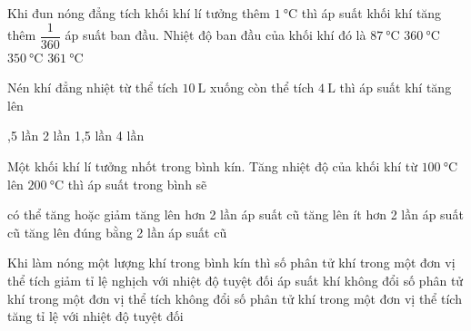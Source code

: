 \begin{ex}
	Khi đun nóng đẳng tích khối khí lí tưởng thêm $\SI{1}{\celsius}$ thì áp suất khối khí tăng thêm $\dfrac{1}{360}$ áp suất ban đầu. Nhiệt độ ban đầu của khối khí đó là 
	\choice
	{\True $\SI{87}{\celsius}$}
	{$\SI{360}{\celsius}$}
	{$\SI{350}{\celsius}$}
	{$\SI{361}{\celsius}$}
\end{ex}
\begin{ex}
Nén khí đẳng nhiệt từ thể tích $\SI{10}{\liter}$ xuống còn thể tích $\SI{4}{\liter}$ thì áp suất khí tăng lên
	
	\choice
	{,5 lần}
	{2 lần}
	{1,5 lần}
	{4 lần}
\end{ex}
\begin{ex}
Một khối khí lí tưởng nhốt trong bình kín. Tăng nhiệt độ của khối khí từ $\SI{100}{\celsius}$ lên $\SI{200}{\celsius}$ thì áp suất trong bình sẽ
	
	\choice
	{có thể tăng hoặc giảm}
	{tăng lên hơn 2 lần áp suất cũ}
	{\True tăng lên ít hơn 2 lần áp suất cũ}
	{tăng lên đúng bằng 2 lần áp suất cũ}
	\loigiai{}
\end{ex}
\begin{ex}
	Khi làm nóng một lượng khí trong bình kín thì
	\choice
	{số phân tử khí trong một đơn vị thể tích giảm tỉ lệ nghịch với nhiệt độ tuyệt đối}
	{\True áp suất khí không đổi}
	{số phân tử khí trong một đơn vị thể tích không đổi}
	{số phân tử khí trong một đơn vị thể tích tăng tỉ lệ với nhiệt độ tuyệt đối}
	\loigiai{}
\end{ex}
